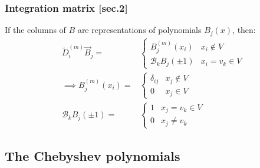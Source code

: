 \documentclass{beamer}
\begin{document}
\begin{frame}
\frametitle{Integration matrix [sec.2]}
If the columns of $B$ are representations of polynomials $B_j(x)$, then:
\begin{align*}
\tilde{D}^{(m)}_i \vec{B}_j = & \begin{cases} B^{(m)}_j(x_i) & x_i \notin V \\ \mathcal{B}_k B_j(\pm 1) & x_i = v_k \in V \end{cases} \\
 \implies B^{(m)}_j(x_i) = & \begin{cases} \delta_{ij} & x_j \notin V \\ 0 & x_j \in V \end{cases} \\
\mathcal{B}_k B_j(\pm 1) = & \begin{cases} 1 & x_j = v_k \in V \\ 0 & x_j \neq v_k \end{cases}
\end{align*}
\end{frame}

\subsection{The Chebyshev polynomials}
\end{document}
